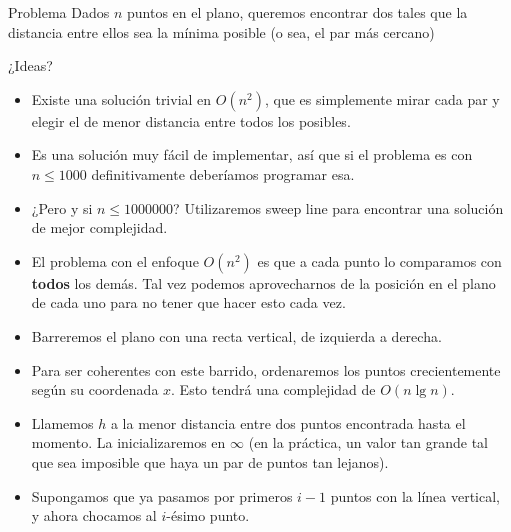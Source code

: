 \documentclass[compress]{beamer}
\begin{document}
\begin{frame}
\begin{block}{Problema}
Dados $n$ puntos en el plano, queremos encontrar dos tales que la distancia entre ellos sea la m\'inima posible (o sea, el par m\'as cercano)
\end{block}
\bigskip
¿Ideas? \pause 
{}
\end{frame}

\begin{frame}
\begin{itemize}
\item Existe una soluci\'on trivial en $O(n^2)$, que es simplemente mirar cada par y elegir el de menor distancia entre todos los posibles.
\bigskip

\item Es una soluci\'on muy f\'acil de implementar, as\'i que si el problema es con $n \leq 1000$ definitivamente deber\'iamos programar esa.
\bigskip

\item ¿Pero y si $n\leq 1000000$? Utilizaremos sweep line para encontrar una soluci\'on de mejor complejidad.
\end{itemize}
\end{frame}

\begin{frame}
\begin{itemize}
\item El problema con el enfoque $O(n^2)$ es que a cada punto lo comparamos con \textbf{todos} los dem\'as. 
Tal vez podemos aprovecharnos de la posici\'on en el plano de cada uno para no tener que hacer esto cada vez.
\bigskip
\item Barreremos el plano con una recta vertical, de izquierda a derecha.
\bigskip
\item Para ser coherentes con este barrido, ordenaremos los puntos crecientemente seg\'un su coordenada $x$. 
Esto tendr\'a una complejidad de $O(n \lg n)$.
\end{itemize}
\end{frame}


\begin{frame}
\begin{itemize}
\item Llamemos $h$ a la menor distancia entre dos puntos encontrada hasta el momento. 
La inicializaremos en $\infty$ (en la pr\'actica, un valor tan grande tal que sea imposible que haya un par de puntos tan lejanos).

\bigskip

\item Supongamos que ya pasamos por primeros $i-1$ puntos con la l\'inea vertical, y ahora chocamos al $i$-\'esimo punto.
\end{itemize}
\end{frame}
\end{document}

